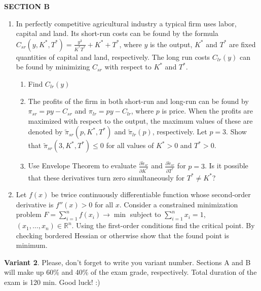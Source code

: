 \documentclass[12pt,a4paper]{article}
\begin{document}
\textbf{SECTION B}

\begin{enumerate}[resume]
\item In perfectly competitive agricultural industry a typical firm uses labor, capital and land. Its short-run costs can be found by the formula $C_{sr}(y,K^*,T^*)=\frac{y^3}{K^*T^*}+K^*+T^*$, where $y$  is the output, $K^*$  and $T^*$  are fixed quantities of capital and land, respectively.
The long run costs $C_{lr}(y)$ can be found by minimizing $C_{sr}$ with respect to $K^*$  and $T^*$.
\begin{enumerate} 
\item Find  $C_{lr}(y)$
\item The profits of the firm in both short-run and long-run can be found by $\pi_{sr}=py-C_{sr}$  and   $\pi_{lr}=py-C_{lr}$, where $p$ is price. When the profits are maximized with respect to the output, the maximum values of these are denoted by $\tilde{\pi}_{sr}(p,K^*,T^*)$ and $\tilde{\pi}_{lr}(p)$, respectively. Let $p=3$. Show that $\tilde{\pi}_{sr}(3,K^*,T^*) \leq 0$ for all values of  $K^*>0$  and  $T^*>0$. 
\item Use Envelope Theorem to evaluate $\frac{\partial \tilde{\pi}_{sr}}{\partial K^*}$ and $\frac{\partial \tilde{\pi}_{sr}}{\partial T^*}$ for $p=3$. Is it possible that these derivatives turn zero simultaneously for $T^* \neq K^*$?
\end{enumerate}

\item Let $f(x)$ be twice continuously differentiable function whose second-order derivative is $f''(x)>0$ for all $x$. Consider a constrained minimization problem $F=\sum_{i=1}^n f(x_i) \to \min$ 
subject to $\sum_{i=1}^n x_i = 1$,  $(x_1, \ldots, x_n)\in \mathbb{R}^n$. Using the first-order conditions find the critical point. By checking bordered Hessian or otherwise show that the found point is minimum.
\end{enumerate}


\newpage
\thispagestyle{empty}
\textbf{Variant 2}. Please, don't forget to write you variant number. Sections A and B will make up 60\% and 40\% of the exam grade, respectively. Total duration of the exam is 120 min. Good luck! :) 

\vspace{10pt}
\end{document}
